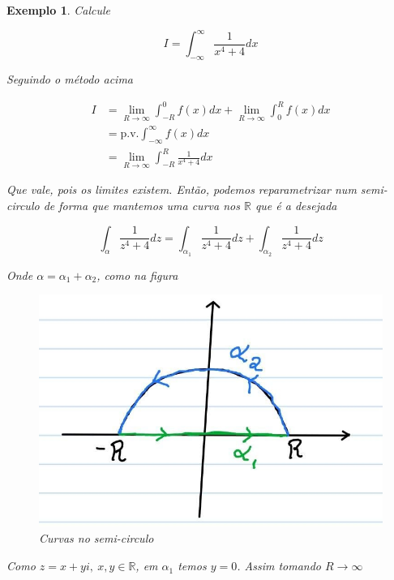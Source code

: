 \documentclass{article}
\newtheorem{ex}{Exemplo}
\begin{document}
\begin{ex}
Calcule

\begin{equation*}
    I = \int_{- \infty}^\infty \frac{1}{x^4 + 4} d x
\end{equation*}

Seguindo o método acima

\begin{align*}
    I &= \lim_{R \to \infty} \int_{-R}^0 f(x) d x + \lim_{R \to \infty} \int_0^R f(x) d x \\
    &= \mathrm{p.v.} \int_{- \infty}^\infty f(x) d x \\
    &= \lim_{R \to \infty} \int_{- R}^R \frac{1}{x^4 + 4} d x
\end{align*}

Que vale, pois os limites existem. Então, podemos reparametrizar num semi-circulo de forma que mantemos uma curva nos $\mathbb{R}$ que é a desejada

\begin{equation*}
    \int_\alpha \frac{1}{z^4 + 4} d z = \int_{\alpha_1} \frac{1}{z^4 + 4} d z + \int_{\alpha_2} \frac{1}{z^4 + 4} d z
\end{equation*}

Onde $\alpha = \alpha_1 + \alpha_2$, como na figura

\begin{figure}[H]
    \centering
    \includegraphics[scale=.4]{exemplo3.png}
    \caption{Curvas no semi-circulo}
    \label{fig:ex3}
\end{figure}

Como $z = x + yi,\ x, y \in \mathbb{R}$, em $\alpha_1$ temos $y = 0$. Assim tomando $R \to \infty$


\end{ex}
\end{document}
